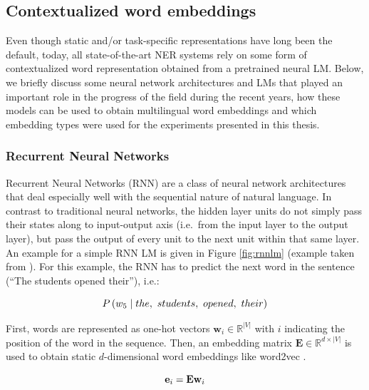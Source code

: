 \documentclass[12pt,a4paper,]{book}
\begin{document}
\hypertarget{contextualized-word-embeddings}{%
\subsection{Contextualized word embeddings}\label{contextualized-word-embeddings}}

Even though static and/or task-specific representations have long been the default, today, all state-of-the-art NER systems rely on some form of contextualized word representation obtained from a pretrained neural LM. Below, we briefly discuss some neural network architectures and LMs that played an important role in the progress of the field during the recent years, how these models can be used to obtain multilingual word embeddings and which embedding types were used for the experiments presented in this thesis.

\hypertarget{recurrent-neural-networks}{%
\subsubsection{Recurrent Neural Networks}\label{recurrent-neural-networks}}

Recurrent Neural Networks (RNN) are a class of neural network architectures that deal especially well with the sequential nature of natural language. In contrast to traditional neural networks, the hidden layer units do not simply pass their states along to input-output axis (i.e.~from the input layer to the output layer), but pass the output of every unit to the next unit within that same layer. An example for a simple RNN LM is given in Figure \ref{fig:rnnlm} (example taken from \citep{manning2019}). For this example, the RNN has to predict the next word in the sentence (``The students opened their''), i.e.:

\begin{equation}
P\left(w_5\mid the, \ students, \ opened, \ their\right) \notag
\end{equation}

First, words are represented as one-hot vectors \(\mathbf{w}_i \in \mathbb{R}^{|V|}\) with \(i\) indicating the position of the word in the sequence. Then, an embedding matrix \(\mathbf{E} \in \mathbb{R}^{d \times |V|}\) is used to obtain static \(d\)-dimensional word embeddings like word2vec \citep{mikolov2013}.

\begin{equation}
\mathbf{e}_i = \mathbf{E}\mathbf{w}_i \notag
\end{equation}
\end{document}
